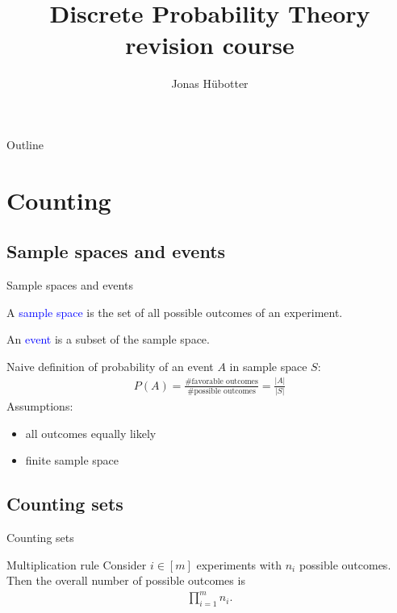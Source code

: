 \documentclass{beamer}
\title[DWT revision course]{Discrete Probability Theory \\ revision course}
\author{Jonas Hübotter}
\date{}
\def\padding{\vspace{0.5cm}}
\def\b{\textcolor{blue}}
\begin{document}
\begin{frame}
  \titlepage
\end{frame}

\begin{frame}{Outline}
 \tableofcontents[subsectionstyle=hide, subsubsectionstyle=hide]
\end{frame}

\section{Counting}

\subsection{Sample spaces and events}
\begin{frame}{Sample spaces and events}
    \begin{definition}
        A \b{sample space} is the set of all possible outcomes of an experiment.
    \end{definition}\pause
    \begin{definition}
        An \b{event} is a subset of the sample space.
    \end{definition}\pause\padding
    Naive definition of probability of an event $A$ in sample space $S$:\pause
    \begin{align*}
        P(A) = \frac{\text{\# favorable outcomes}}{\text{\# possible outcomes}} = \frac{|A|}{|S|}
    \end{align*}\pause
    Assumptions:\pause
    \begin{itemize}
        \item all outcomes equally likely\pause
        \item finite sample space
    \end{itemize}
\end{frame}

\subsection{Counting sets}
\begin{frame}{Counting sets}
    \begin{block}{Multiplication rule}
        Consider $i \in [m]$ experiments with $n_i$ possible outcomes. Then the overall number of possible outcomes is
        \begin{align*}
            \prod_{i=1}^m n_i.
        \end{align*}
    \end{block}
\end{frame}
\end{document}
